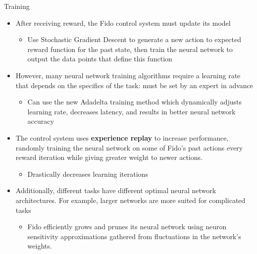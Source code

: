 \documentclass[final]{beamer}
\newlength{\onecolwid}
\newlength{\twocolwid}
\begin{document}
\begin{frame}[t]
\begin{columns}[t]
\begin{column}{\twocolwid}
\begin{columns}[t,totalwidth=\twocolwid]
\begin{column}{\onecolwid}
\begin{block}{Training}
	\begin{itemize}
		\item After receiving reward, the Fido control system must update its model
		\begin{itemize}
			\item Use Stochastic Gradient Descent to generate a new action to expected reward function for the past state, then train the neural network to output the data points that define this function
		\end{itemize}
		\item However, many neural network training algorithms require a learning rate that depends on the specifics of the task: must be set by an expert in advance
		\begin{itemize}
			\item Can use the new Adadelta training method which dynamically adjusts learning rate, decreases latency, and results in better neural network accuracy
		\end{itemize}
		\item The control system uses \textbf{experience replay} to increase performance, randomly training the neural network on some of Fido's past actions every reward iteration while giving greater weight to newer actions.
		\begin{itemize}
			\item Drastically decreases learning iterations
		\end{itemize}
		\item Additionally, different tasks have different optimal neural network architectures. For example, larger networks are more suited for complicated tasks
		\begin{itemize}
			\item Fido efficiently grows and prunes its neural network using neuron sensitivity approximations gathered from fluctuations in the network's weights.
		\end{itemize}
	\end{itemize}

\end{block}\end{column}

\end{columns}



\end{column}
\end{columns}
\end{frame}
\end{document}
